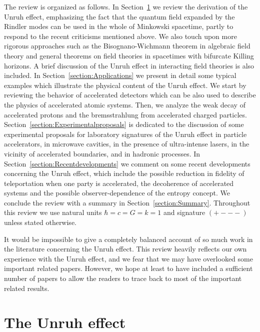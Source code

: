 \documentclass[12pt,nofootinbib,floatfix,aps,prd,showpacs,amsmath,amssymb,eqsecnum]{revtex4-2}
\begin{document}
The review is organized as follows. In Section~\ref{section:Unruheffect} 
we review the derivation of the Unruh effect, 
emphasizing the fact that
the quantum field expanded by the Rindler modes can be used in the whole
of Minkowski spacetime, partly to respond to 
the recent criticisms mentioned above.
We also touch upon more rigorous 
approaches 
such as the Bisognano-Wichmann theorem 
in algebraic field theory and
general theorems on field theories in spacetimes 
with bifurcate Killing horizons.
A brief discussion of the Unruh effect in interacting field theories is
also included. 
In Section~\ref{section:Applications} we present in detail some 
typical examples which illustrate the physical content of the Unruh 
effect. We start by reviewing the behavior of accelerated detectors
which can be also used to describe the physics of accelerated atomic systems. 
Then, we analyze the weak decay of accelerated protons 
and the bremsstrahlung from accelerated charged particles.
Section~\ref{section:Experimentalproposals} is dedicated to the 
discussion of some experimental proposals for laboratory signatures
of the Unruh effect in particle accelerators,
in microwave cavities, in the presence of ultra-intense lasers, 
in the vicinity of
accelerated boundaries, and in hadronic processes. 
In Section~\ref{section:Recentdevelopments} we comment on some recent
developments concerning  the Unruh effect, which include
the possible reduction in fidelity of teleportation when one 
party is accelerated, the decoherence of accelerated systems
and the possible observer-dependence of the entropy concept. 
We conclude the review with a summary in Section~\ref{section:Summary}. 
Throughout this review 
we use natural units $\hbar=c=G=k=1$ and signature $(+ - - -)$ 
unless stated otherwise.

It would be impossible to give a completely balanced account of so much 
work in the literature concerning the Unruh effect.  This review heavily
reflects our own experience with the Unruh effect, 
and we fear that we may have overlooked some important related papers.
However, we hope at least to have included 
a sufficient number of papers to allow the 
readers to trace back to most of the important related results. 

\section{The Unruh effect}
\label{section:Unruheffect}
\end{document}
